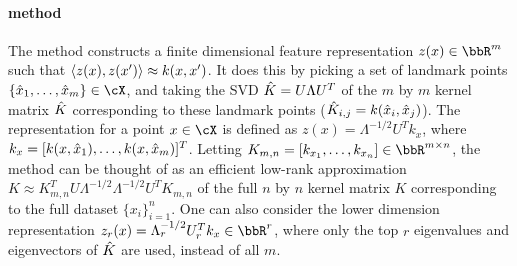 
\paragraph{\Nystrom method}
The \Nystrom method constructs a finite dimensional feature representation
$z(x) \in \RR^m$ such that $\left\langle z(x),z(x')\right\rangle \approx k(x,x')$.  It does this
by picking a set of landmark points $\{\hx_1,\ldots,\hx_m\} \in \cX$,
and taking the SVD $\hat{K} = U\Lambda U^T$ of the $m$ by $m$ 
kernel matrix $\hat{K}$ corresponding to these landmark points 
($\hat{K}_{i,j} = k(\hat{x}_i,\hat{x}_j)$).  The \Nystrom representation for a point $x \in \cX$
is defined as $z(x) = \Lambda^{-1/2} U^T k_x$, where $k_x = [k(x,\hat{x}_1),\ldots,k(x,\hat{x}_m)]^T$.
Letting $K_{m,n} = [k_{x_1},\ldots,k_{x_n}] \in \RR^{m\times n}$, 
the \Nystrom method can be thought of as an efficient low-rank approximation
$K \approx K_{m,n}^T U \Lambda^{-1/2}\Lambda^{-1/2} U^T K_{m,n}$ of the full
$n$ by $n$ kernel matrix $K$ corresponding to the full dataset $\{x_i\}_{i=1}^n$.
One can also consider the lower dimension \Nystrom representation
$z_r(x) = \Lambda_r^{-1/2} U_r^T k_x \in \RR^r$, where only the top $r$ eigenvalues and
eigenvectors of $\hat{K}$ are used, instead of all $m$.

